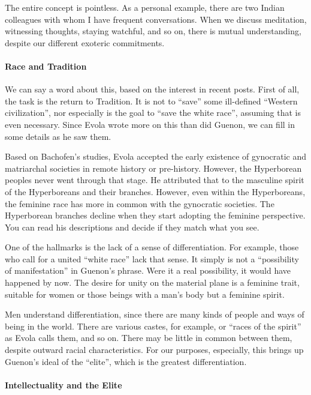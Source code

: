 The entire concept is pointless. As a personal example, there are two Indian colleagues with whom I have frequent conversations. When we discuss meditation, witnessing thoughts, staying watchful, and so on, there is mutual understanding, despite our different exoteric commitments.

\paragraph{Race and Tradition}


We can say a word about this, based on the interest in recent posts. First of all, the task is the return to Tradition. It is not to ``save'' some ill-defined ``Western civilization'', nor especially is the goal to ``save the white race'', assuming that is even necessary. Since Evola wrote more on this than did Guenon, we can fill in some details as he saw them.

Based on Bachofen's studies, Evola accepted the early existence of gynocratic and matriarchal societies in remote history or pre-history. However, the Hyperborean peoples never went through that stage. He attributed that to the masculine spirit of the Hyperboreans and their branches. However, even within the Hyperboreans, the feminine race has more in common with the gynocratic societies. The Hyperborean branches decline when they start adopting the feminine perspective. You can read his descriptions and decide if they match what you see.

One of the hallmarks is the lack of a sense of differentiation. For example, those who call for a united ``white race'' lack that sense. It simply is not a ``possibility of manifestation'' in Guenon's phrase. Were it a real possibility, it would have happened by now. The desire for unity on the material plane is a feminine trait, suitable for women or those beings with a man's body but a feminine spirit.

Men understand differentiation, since there are many kinds of people and ways of being in the world. There are various castes, for example, or ``races of the spirit'' as Evola calls them, and so on. There may be little in common between them, despite outward racial characteristics. For our purposes, especially, this brings up Guenon's ideal of the ``elite'', which is the greatest differentiation.

\paragraph{Intellectuality and the Elite}


